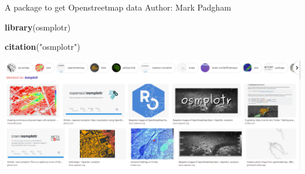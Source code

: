 \documentclass[
  ignorenonframetext,
]{beamer}
\newenvironment{Shaded}{\begin{snugshade}}{\end{snugshade}}
\newcommand{\KeywordTok}[1]{\textcolor[rgb]{0.13,0.29,0.53}{\textbf{#1}}}
\newcommand{\NormalTok}[1]{#1}
\newcommand{\StringTok}[1]{\textcolor[rgb]{0.31,0.60,0.02}{#1}}
\begin{document}
\begin{frame}[fragile]{A package to get Openstreetmap data}
\protect\hypertarget{a-package-to-get-openstreetmap-data}{}
Author: Mark Padgham

\begin{Shaded}
\begin{Highlighting}[]
\KeywordTok{library}\NormalTok{(osmplotr)}
\end{Highlighting}
\end{Shaded}

\begin{Shaded}
\begin{Highlighting}[]
\KeywordTok{citation}\NormalTok{(}\StringTok{"osmplotr"}\NormalTok{)}
\end{Highlighting}
\end{Shaded}

\includegraphics{pics/osmplotr_google.png}
\end{frame}
\end{document}

